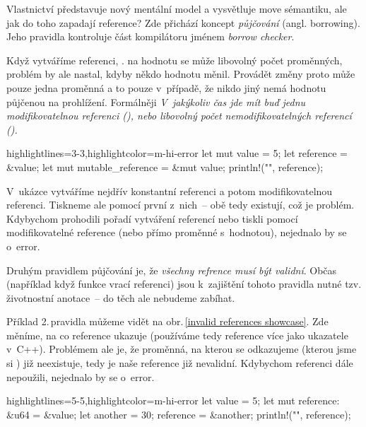 \documentclass[main.tex]{subfiles}
\begin{document}

Vlastnictví představuje nový mentální model a vysvětluje move sémantiku, ale jak do toho
zapadají reference? Zde přichází koncept \emph{půjčování} (angl. borrowing). Jeho pravidla
kontroluje část kompilátoru jménem \emph{borrow checker}.

Když vytváříme referenci, .  na hodnotu se může
libovolný počet proměnných, problém by ale nastal, kdyby někdo hodnotu měnil. Provádět
změny proto může pouze jedna proměnná a to pouze v~případě, že nikdo jiný nemá hodnotu
půjčenou na prohlížení. Formálněji \emph{V~jakýkoliv čas jde mít buď jednu
    modifikovatelnou referenci (), nebo libovolný počet nemodifikovatelných
    referencí ().} \cite[sekce\,4.2]{thebook}

\obrazek
\begin{rustcode*}{highlightlines={3-3},highlightcolor=m-hi-error}
    let mut value = 5;
    let reference = &value;
    let mut mutable_reference = &mut value;
    println!("{}", reference);
\end{rustcode*}
\newline
{}

V~ukázce vytváříme nejdřív konstantní referenci a potom modifikovatelnou referenci.
Tiskneme ale pomocí první z~nich~-- obě tedy existují, což je problém. Kdybychom prohodili
pořadí vytváření referencí nebo tiskli pomocí modifikovatelné reference (nebo přímo
proměnné s~hodnotou), nejednalo by se o~error.

Druhým pravidlem půjčování je, že \emph{všechny refrence musí být validní}. Občas
(například když funkce vrací referenci) jsou k~zajištění tohoto pravidla nutné tzv.
životnostní anotace~-- do těch ale nebudeme zabíhat.

Příklad 2.\,pravidla můžeme vidět na obr.\,\ref{invalid references showcase}. Zde měníme,
na co reference ukazuje (používáme tedy reference více jako ukazatele v~C++). Problémem
ale je, že proměnná, na kterou se odkazujeme (kterou jsme si ) již neexistuje,
tedy je naše reference již nevalidní. Kdybychom referenci dále nepoužili, nejednalo by se
o~error.

\obrazek
\begin{rustcode*}{highlightlines={5-5},highlightcolor=m-hi-error}
    let value = 5;
    let mut reference: &u64 = &value;
    {
        let another = 30;
        reference = &another;
    }
    println!("{}", reference);
\end{rustcode*}
\newline
{}
\end{document}
